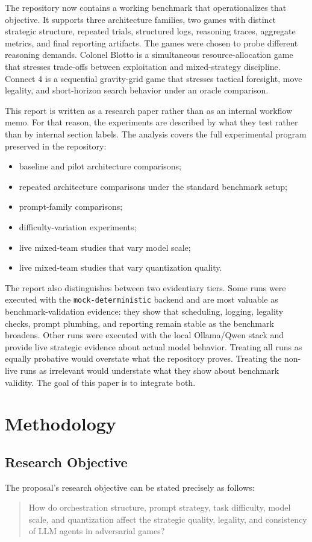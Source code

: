 \documentclass[11pt]{article}
\begin{document}
The repository now contains a working benchmark that operationalizes that objective. It supports three architecture families, two games with distinct strategic structure, repeated trials, structured logs, reasoning traces, aggregate metrics, and final reporting artifacts. The games were chosen to probe different reasoning demands. Colonel Blotto is a simultaneous resource-allocation game that stresses trade-offs between exploitation and mixed-strategy discipline. Connect 4 is a sequential gravity-grid game that stresses tactical foresight, move legality, and short-horizon search behavior under an oracle comparison.

This report is written as a research paper rather than as an internal workflow memo. For that reason, the experiments are described by what they test rather than by internal section labels. The analysis covers the full experimental program preserved in the repository:
\begin{itemize}
  \item baseline and pilot architecture comparisons;
  \item repeated architecture comparisons under the standard benchmark setup;
  \item prompt-family comparisons;
  \item difficulty-variation experiments;
  \item live mixed-team studies that vary model scale;
  \item live mixed-team studies that vary quantization quality.
\end{itemize}

The report also distinguishes between two evidentiary tiers. Some runs were executed with the \texttt{mock-deterministic} backend and are most valuable as benchmark-validation evidence: they show that scheduling, logging, legality checks, prompt plumbing, and reporting remain stable as the benchmark broadens. Other runs were executed with the local Ollama/Qwen stack and provide live strategic evidence about actual model behavior. Treating all runs as equally probative would overstate what the repository proves. Treating the non-live runs as irrelevant would understate what they show about benchmark validity. The goal of this paper is to integrate both.

\section{Methodology}

\subsection{Research Objective}
The proposal's research objective can be stated precisely as follows:
\begin{quote}
How do orchestration structure, prompt strategy, task difficulty, model scale, and quantization affect the strategic quality, legality, and consistency of LLM agents in adversarial games?
\end{quote}
\end{document}
